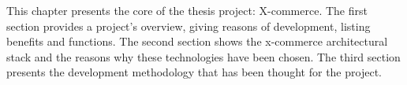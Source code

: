 This chapter presents the core of the thesis project: X-commerce.
The first section provides a project’s overview, giving reasons of development, listing benefits and functions. The second section shows the x-commerce architectural stack and the reasons why these technologies have been chosen. The third section presents the development methodology that has been thought for the project.